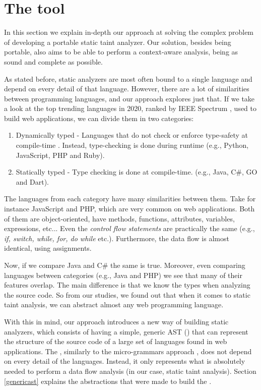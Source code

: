 \section{The \toolname{} tool}
\label{solution}
In this section we explain in-depth our approach at solving the complex problem of developing a portable static taint analyzer. Our solution, besides being portable, also aims to be able to perform a context-aware analysis, being as sound and complete as possible.

As stated before, static analyzers are most often bound to a single language and depend on every detail of that language. However, there are a lot of similarities between programming languages, and our approach explores just that. If we take a look at the top trending languages in 2020, ranked by IEEE Spectrum \cite{cass2020top}, used to build web applications, we can divide them in two categories:

\begin{enumerate}
    \item Dynamically typed - Languages that do not check or enforce type-safety at compile-time \cite{tratt2009dynamically}. Instead, type-checking is done during runtime (e.g., Python, JavaScript, PHP and Ruby).
    \item Statically typed - Type checking is done at compile-time. (e.g., Java, C\#, GO and Dart).
\end{enumerate}


The languages from each category have many similarities between them. Take for instance JavaScript and PHP, which are very common on web applications. Both of them are object-oriented, have methods, functions, attributes, variables, expressions, etc... Even the \textit{control flow statements} are practically the same (e.g., \textit{if, switch, while, for, do while} etc.). Furthermore, the data flow is almost identical, using assignments. 

Now, if we compare Java and C\# the same is true. Moreover, even comparing languages between categories (e.g., Java and PHP) we see that many of their features overlap. The main difference is that we know the types when analyzing the source code. So from our studies, we found out that when it comes to static taint analysis, we can abstract almost any web programming language. 

With this in mind, our approach introduces a new way of building static analyzers, which consists of having a simple, generic AST (\astname{}) that can represent the structure of the source code of a large set of languages found in web applications. The \astname{}, similarly to the micro-grammars approach \cite{microgrammars}, does not depend on every detail of the languages. Instead, it only represents what is absolutely needed to perform a data flow analysis (in our case, static taint analysis). Section \ref{genericast} explains the abstractions that were made to build the \astname{}.

